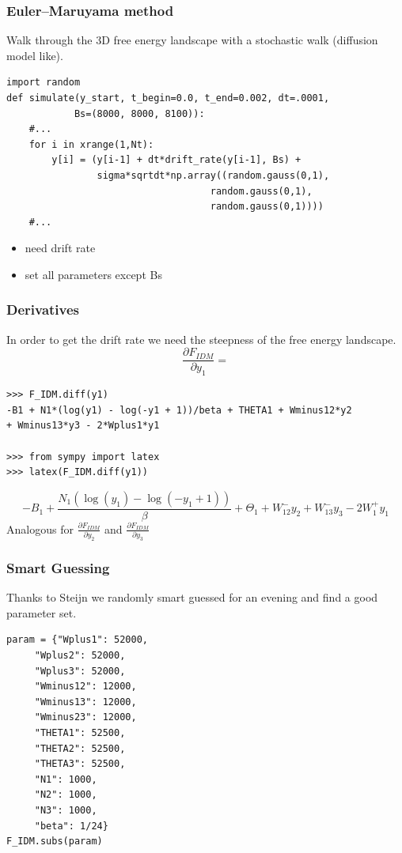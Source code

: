 \documentclass[xcolor={fixpdftex,hyperref,x11names},10pt,pdftex,hyperref={pdftex}]{beamer}
\renewcommand{\emph}[1]{\color{red}#1 \color{black}}
\begin{document}
\begin{frame}[fragile]
  \frametitle{Euler–Maruyama method}
  Walk through the 3D free energy landscape with a stochastic walk
  (diffusion model like).
  \begin{lstlisting}
import random
def simulate(y_start, t_begin=0.0, t_end=0.002, dt=.0001,
            Bs=(8000, 8000, 8100)):
    #...
    for i in xrange(1,Nt):
        y[i] = (y[i-1] + dt*drift_rate(y[i-1], Bs) +
                sigma*sqrtdt*np.array((random.gauss(0,1),
                                    random.gauss(0,1),
                                    random.gauss(0,1))))
    #...
  \end{lstlisting}
  \begin{itemize}
      \item need \emph{drift rate}
      \item set \emph{all parameters} except Bs
  \end{itemize}
\end{frame}

\begin{frame}[fragile]
  \frametitle{Derivatives}
In order to get the drift rate we need the steepness of the free energy
landscape.
$$\frac{\partial F_{IDM}}{\partial y_1} =$$
  \begin{lstlisting}
>>> F_IDM.diff(y1)
-B1 + N1*(log(y1) - log(-y1 + 1))/beta + THETA1 + Wminus12*y2
+ Wminus13*y3 - 2*Wplus1*y1

>>> from sympy import latex
>>> latex(F_IDM.diff(y1))
  \end{lstlisting}
  $$- B_{1} + \frac{N_{1} (\operatorname{log}(y_{1}) -
\operatorname{log}(- y_{1} + 1))}{\beta} + \Theta_{1} +
W^-_{12} y_{2} + W^-_{13} y_{3} - 2 W^+_{1} y_{1}$$
Analogous for $\frac{\partial F_{IDM}}{\partial y_2}$ and $\frac{\partial
F_{IDM}}{\partial y_3}$
\end{frame}

\begin{frame}[fragile]
  \frametitle{Smart Guessing}
  Thanks to Steijn we randomly smart guessed for an evening and find a good
  parameter set.
  \begin{lstlisting}
param = {"Wplus1": 52000,
     "Wplus2": 52000,
     "Wplus3": 52000,
     "Wminus12": 12000,
     "Wminus13": 12000,
     "Wminus23": 12000,
     "THETA1": 52500,
     "THETA2": 52500,
     "THETA3": 52500,
     "N1": 1000,
     "N2": 1000,
     "N3": 1000,
     "beta": 1/24}
F_IDM.subs(param)
  \end{lstlisting}
\end{frame}
\end{document}
